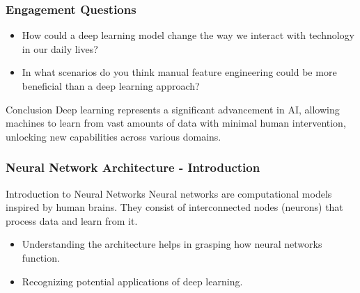 \documentclass[aspectratio=169]{beamer}
\begin{document}
\begin{frame}[fragile]
    \frametitle{Engagement Questions}
    
    \begin{itemize}
        \item How could a deep learning model change the way we interact with technology in our daily lives?
        \item In what scenarios do you think manual feature engineering could be more beneficial than a deep learning approach?
    \end{itemize}
    
    \begin{block}{Conclusion}
        Deep learning represents a significant advancement in AI, allowing machines to learn from vast amounts of data with minimal human intervention, unlocking new capabilities across various domains.
    \end{block}
\end{frame}

\begin{frame}[fragile]
    \frametitle{Neural Network Architecture - Introduction}
    \begin{block}{Introduction to Neural Networks}
        Neural networks are computational models inspired by human brains. 
        They consist of interconnected nodes (neurons) that process data and learn from it.
    \end{block}
    \begin{itemize}
        \item Understanding the architecture helps in grasping how neural networks function.
        \item Recognizing potential applications of deep learning.
    \end{itemize}
\end{frame}
\end{document}
